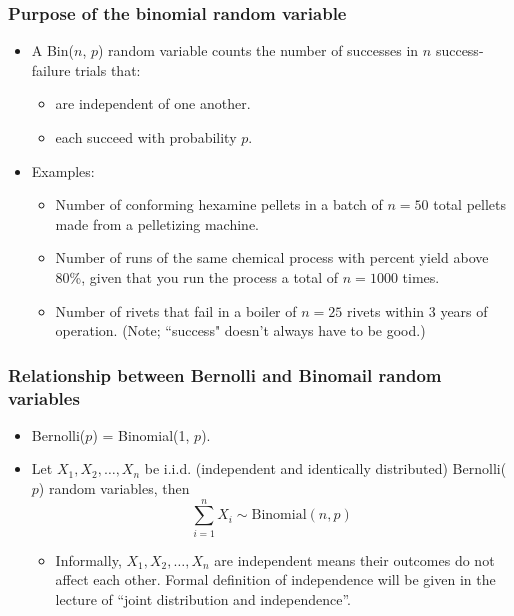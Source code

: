 \documentclass[handout]{beamer}\usepackage[]{graphicx}\usepackage[]{color}
\numberwithin{equation}{section}
\begin{document}
\begin{frame}
\frametitle{Purpose of the binomial random variable}
\begin{itemize}
\item  A Bin($n$, $p$) random variable counts the number of successes in $n$ success-failure trials that:
\begin{itemize}
\pause \item are independent of one another.
\pause \item each succeed with probability $p$.
\end{itemize}
\pause \item Examples:
\begin{itemize}
\pause \item Number of conforming hexamine pellets in a batch of $n = 50$ total pellets made from a pelletizing machine.
\pause \item Number of runs of the same chemical process with percent yield above 80\%, given that you run the process a total of $n = 1000$ times.
\pause \item Number of rivets that fail in a boiler of $n = 25$ rivets within 3 years of operation. (Note; ``success" doesn't always have to be good.)
\end{itemize}
\end{itemize}
\end{frame}

\begin{frame}
\frametitle{Relationship between Bernolli and Binomail random variables}
\begin{itemize}
\item
Bernolli($p$) = Binomial(1, $p$).
\item
Let $X_1, X_2, \ldots, X_n$ be i.i.d. (independent and identically distributed) Bernolli($p$) random variables, then 
\[\sum_{i=1}^n X_i \sim \mbox{Binomial}(n, p)\]
\begin{itemize}
\item
Informally, $X_1, X_2, \ldots, X_n$ are independent means their outcomes do not affect each other. Formal definition of independence will be given in the lecture of ``joint distribution and independence''. 
\end{itemize}
\end{itemize}
\end{frame}
\end{document}
